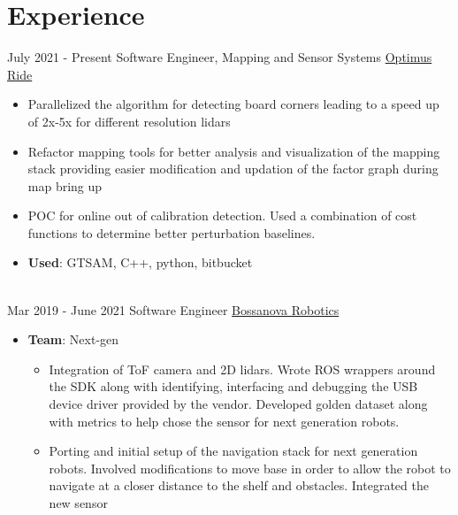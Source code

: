 \documentclass[letterpaper]{twentysecondcv} %
\begin{document}
\makeprofile %


\section{Experience}

\begin{twenty} %
    \twentyitem
    {July 2021 -}
    {Present}
    {Software Engineer, Mapping and Sensor Systems}
    {\href{https://www.optimusride.com//}{Optimus Ride}}
    {}
    {\begin{itemize}
        \item Parallelized the algorithm for detecting board corners leading to a speed up of 2x-5x
            for different resolution lidars
        \item Refactor mapping tools for better analysis and visualization of the mapping stack providing easier
            modification and updation of the factor graph during map bring up
        \item POC for online out of calibration detection. Used a combination of cost functions to determine
            better perturbation baselines.
        \item \textbf{Used}: GTSAM, C++, python, bitbucket
    \end{itemize}}
    \\
    \twentyitem
    {Mar 2019 -}
    {June 2021}
    {Software Engineer}
    {\href{http://www.bossanova.com/}{Bossanova Robotics}}
    {}
    {
        {\begin{itemize}
            \item \textbf{Team}: Next-gen
                {\begin{itemize}
                    \item Integration of ToF camera and 2D lidars. Wrote ROS wrappers around the SDK along with identifying,
                        interfacing and debugging the USB device driver provided by the vendor. Developed golden dataset along with
                        metrics to help chose the sensor for next generation robots.
                    \item Porting and initial setup of the navigation stack for next generation robots. Involved modifications to move base
                        in order to allow the robot to navigate at a closer distance to the shelf and obstacles. Integrated the new sensor

\end{itemize}}
\end{itemize}}}
\end{twenty}
\end{document}
